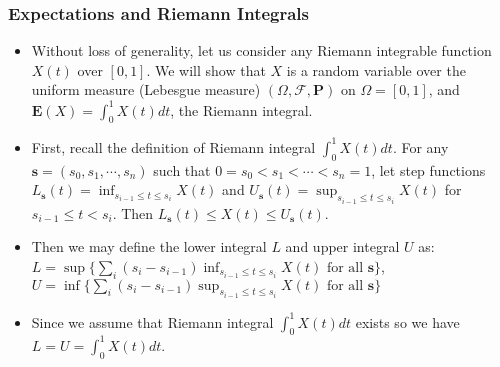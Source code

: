 \documentclass[handout]{beamer}
\newcommand{\BP}{\mathbf{P}}
\newcommand{\BE}{\mathbf{E}}
\begin{document}
\frame
{
  \frametitle{Expectations and Riemann Integrals}

   \begin{itemize}

     
   \item<1->Without loss of generality, let us consider any Riemann integrable function $X(t)$ over $[0,1]$.  We will show that $X$ is a random variable over the uniform measure (Lebesgue measure) $(\Omega, \mathcal{F}, \BP)$ on $\Omega=[0,1]$, and $\BE(X)=\int_{0}^1 X(t) dt$, the Riemann integral. 
   

   \item<2-> First, recall the definition of Riemann integral $\int_{0}^1 X(t) dt$. For any $\mathbf{s}=(s_0, s_1,\cdots, s_n)$ such that $0=s_0 < s_1 < \cdots < s_n=1$, let step functions $L_{\mathbf{s}} (t)=\inf_{s_{i-1} \le t \le s_i} X(t)$ and $U_{\mathbf{s}} (t)=\sup_{s_{i-1} \le t \le s_i} X(t)$ for $s_{i-1} \le t < s_i$. Then $L_{\mathbf{s}} (t) \leq X(t) \leq U_{\mathbf{s}} (t)$.
 
    \item<3-> Then we may define the lower integral $L$ and upper integral $U$ as:
    $L=\sup\{\sum_{i} (s_i-s_{i-1}) \inf_{s_{i-1} \le t \le s_i} X(t) \text{ for all } \mathbf{s}\}$, $U=\inf \{\sum_{i} (s_i-s_{i-1}) \sup_{s_{i-1} \le t \le s_i} X(t)\text{ for all } \mathbf{s}\}$

    \item<4-> Since we assume that Riemann integral $\int_{0}^1 X(t) dt$ exists so we have  $L=U=\int_{0}^1 X(t) dt$.
   
   

\end{itemize}
}
\end{document}

